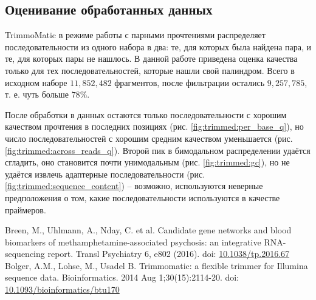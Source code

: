 \documentclass[a4paper,12pt]{article}
\begin{document}
\subsection{Оценивание обработанных данных}

TrimmoMatic в режиме работы с парными прочтениями распределяет последовательности из одного набора в два: те, для которых была найдена пара, и те, для которых пары не нашлось.
В данной работе приведена оценка качества только для тех последовательностей, которые нашли свой палиндром.
Всего в исходном наборе $ 11, 852, 482 $ фрагментов, после фильтрации остались $ 9, 257, 785 $, т. е. чуть больше $ 78\% $.

После обработки в данных остаются только последовательности с хорошим качеством прочтения в последних позициях (рис. \ref{fig:trimmed:per_base_q}), но число последовательностей с хорошим средним качеством уменьшается (рис. \ref{fig:trimmed:across_reads_q}).
Второй пик в бимодальном распределении удаётся сгладить, оно становится почти унимодальным (рис. \ref{fig:trimmed:gc}), но не удаётся извлечь адаптерные последовательности (рис. \ref{fig:trimmed:sequence_content}) -- возможно, используются неверные предположения о том, какие последовательности используются в качестве праймеров.

\begin{thebibliography}{99}
     Breen, M., Uhlmann, A., Nday, C. et al. Candidate gene networks and blood biomarkers of methamphetamine-associated psychosis: an integrative RNA-sequencing report. Transl Psychiatry 6, e802 (2016). doi: \href{https://doi.org/10.1038/tp.2016.67}{10.1038/tp.2016.67}
     Bolger, A.M., Lohse, M., Usadel B. Trimmomatic: a flexible trimmer for Illumina sequence data. Bioinformatics. 2014 Aug 1;30(15):2114-20. doi: \href{https://doi.org/10.1093/bioinformatics/btu170}{10.1093/bioinformatics/btu170}
\end{thebibliography}

\newpage

\end{document}
